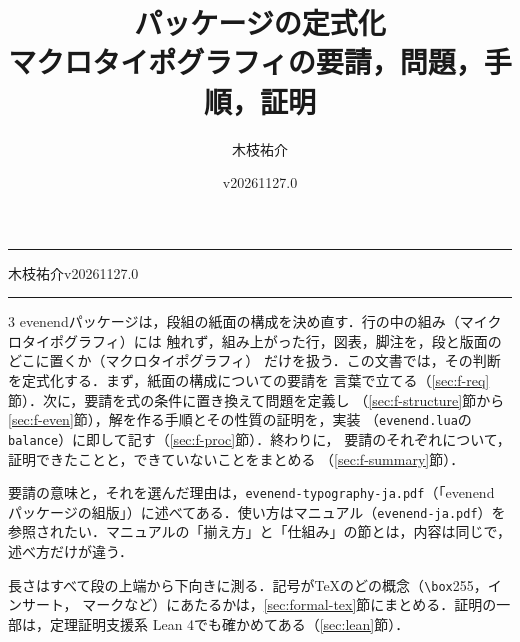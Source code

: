 \documentclass[paper=a4,fontsize=10pt]{jlreq}
\title{\pkg{evenend}パッケージの定式化\\[.5\baselineskip]
  \large マクロタイポグラフィの要請，問題，手順，証明}
\author{木枝祐介}
\date{v20261127.0}
\newcommand\cs[1]{\texttt{\textbackslash #1}}
\newcommand\pkg[1]{\textsf{#1}}
\begin{document}
\thispagestyle{plain}
\noindent\rule{\textwidth}{1.6pt}\par
\vspace{1.2\baselineskip}
%
\par
\vspace{.9\baselineskip}
\hfill
{\large 木枝祐介\hspace{1\zw}v20261127.0}\par
\vspace{.5\baselineskip}
\noindent\rule{\textwidth}{.4pt}\par
\vspace{1.5\baselineskip}

\begin{evenendmulticols}[columnsep=2.5\zw,columnseprule=.4pt]{3}
evenendパッケージは，段組の紙面の構成を決め直す．行の中の組み（マイクロタイポグラフィ）には
触れず，組み上がった行，図表，脚注を，段と版面のどこに置くか（マクロタイポグラフィ）
だけを扱う．この文書では，その判断を定式化する．まず，紙面の構成についての要請を
言葉で立てる（\ref{sec:f-req}節）．次に，要請を式の条件に置き換えて問題を定義し
（\ref{sec:f-structure}節から\ref{sec:f-even}節），解を作る手順とその性質の証明を，実装
（\texttt{evenend.lua}の\texttt{balance}）に即して記す（\ref{sec:f-proc}節）．終わりに，
要請のそれぞれについて，証明できたことと，できていないことをまとめる
（\ref{sec:f-summary}節）．

要請の意味と，それを選んだ理由は，\texttt{evenend-typography-ja.pdf}（「\pkg{evenend}
パッケージの組版」）に述べてある．使い方はマニュアル（\texttt{evenend-ja.pdf}）を
参照されたい．マニュアルの「揃え方」と「仕組み」の節とは，内容は同じで，述べ方だけが違う．

長さはすべて段の上端から下向きに測る．記号が\TeX{}のどの概念（\cs{box}255，インサート，
マークなど）にあたるかは，\ref{sec:formal-tex}節にまとめる．証明の一部は，定理証明支援系
Lean 4でも確かめてある（\ref{sec:lean}節）．
\end{evenendmulticols}
\end{document}
